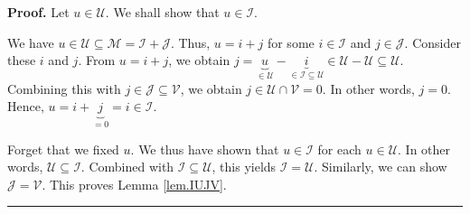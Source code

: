 \documentclass[numbers=enddot,12pt,final,onecolumn,notitlepage]{scrartcl}%
\numberwithin{exer}{subsection}
\theoremstyle{definition}
\newenvironment{proof}[1][Proof]{\noindent\textbf{#1.} }{\ \rule{0.5em}{0.5em}}
\begin{document}
\begin{proof}
Let $u\in\mathcal{U}$. We shall show that $u\in\mathcal{I}$.

We have $u\in\mathcal{U}\subseteq\mathcal{M}=\mathcal{I}+\mathcal{J}$. Thus,
$u=i+j$ for some $i\in\mathcal{I}$ and $j\in\mathcal{J}$. Consider these $i$
and $j$. From $u=i+j$, we obtain $j=\underbrace{u}_{\in\mathcal{U}%
}-\underbrace{i}_{\in\mathcal{I}\subseteq\mathcal{U}}\in\mathcal{U}%
-\mathcal{U}\subseteq\mathcal{U}$. Combining this with $j\in\mathcal{J}%
\subseteq\mathcal{V}$, we obtain $j\in\mathcal{U}\cap\mathcal{V}=0$. In other
words, $j=0$. Hence, $u=i+\underbrace{j}_{=0}=i\in\mathcal{I}$.

Forget that we fixed $u$. We thus have shown that $u\in\mathcal{I}$ for each
$u\in\mathcal{U}$. In other words, $\mathcal{U}\subseteq\mathcal{I}$. Combined
with $\mathcal{I}\subseteq\mathcal{U}$, this yields $\mathcal{I}=\mathcal{U}$.
Similarly, we can show $\mathcal{J}=\mathcal{V}$. This proves Lemma
\ref{lem.IUJV}.
\end{proof}
\end{document}
